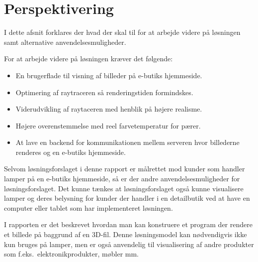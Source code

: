 \section{Perspektivering}
I dette afsnit forklares der hvad der skal til for at arbejde videre på løsningen samt alternative anvendelsesmuligheder. 

For at arbejde videre på løsningen kræver det følgende:

\begin{itemize}
\item En brugerflade til visning af billeder på e-butiks hjemmeside.
\item Optimering af raytraceren så renderingstiden formindskes. 
\item Viderudvikling af raytaceren med henblik på højere realisme.
\item Højere overenstemmelse med reel farvetemperatur for pærer.  
\item At lave en backend for kommunikationen mellem serveren hvor billederne renderes og en e-butiks hjemmeside.
\end{itemize}

Selvom løsningsforslaget i denne rapport er målrettet mod kunder som handler lamper på en e-butiks hjemmeside, så er der andre anvendelsesmuligheder for løsningsforslaget. Det kunne tænkes at løsningsforslaget også kunne visualisere lamper og deres belysning for kunder der handler i en detailbutik ved at have en computer eller tablet som har implementeret løsningen. 

I rapporten er det beskrevet hvordan man kan konstruere et program der rendere et billede på baggrund af en 3D-fil. Denne løsningsmodel kan nødvendigvis ikke kun bruges på lamper, men er også anvendelig til visualisering af andre produkter som f.eks.\ elektronikprodukter, møbler mm.\ 






\clearpage